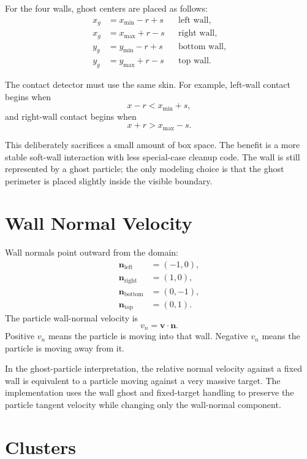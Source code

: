 \documentclass[11pt]{article}
\begin{document}
For the four walls, ghost centers are placed as follows:
\[
\begin{aligned}
    x_g &= x_{\min} - r + s && \text{left wall},\\
    x_g &= x_{\max} + r - s && \text{right wall},\\
    y_g &= y_{\min} - r + s && \text{bottom wall},\\
    y_g &= y_{\max} + r - s && \text{top wall}.
\end{aligned}
\]

The contact detector must use the same skin. For example, left-wall contact
begins when
\[
    x - r < x_{\min} + s,
\]
and right-wall contact begins when
\[
    x + r > x_{\max} - s.
\]

This deliberately sacrifices a small amount of box space. The benefit is a
more stable soft-wall interaction with less special-case cleanup code. The wall
is still represented by a ghost particle; the only modeling choice is that the
ghost perimeter is placed slightly inside the visible boundary.

\section{Wall Normal Velocity}

Wall normals point outward from the domain:
\[
\begin{aligned}
    \mathbf{n}_{\mathrm{left}} &= (-1, 0),\\
    \mathbf{n}_{\mathrm{right}} &= (1, 0),\\
    \mathbf{n}_{\mathrm{bottom}} &= (0, -1),\\
    \mathbf{n}_{\mathrm{top}} &= (0, 1).
\end{aligned}
\]
The particle wall-normal velocity is
\[
    v_n = \mathbf{v}\cdot\mathbf{n}.
\]
Positive \(v_n\) means the particle is moving into that wall. Negative \(v_n\)
means the particle is moving away from it.

In the ghost-particle interpretation, the relative normal velocity against a
fixed wall is equivalent to a particle moving against a very massive target.
The implementation uses the wall ghost and fixed-target handling to preserve
the particle tangent velocity while changing only the wall-normal component.

\section{Clusters}
\end{document}
